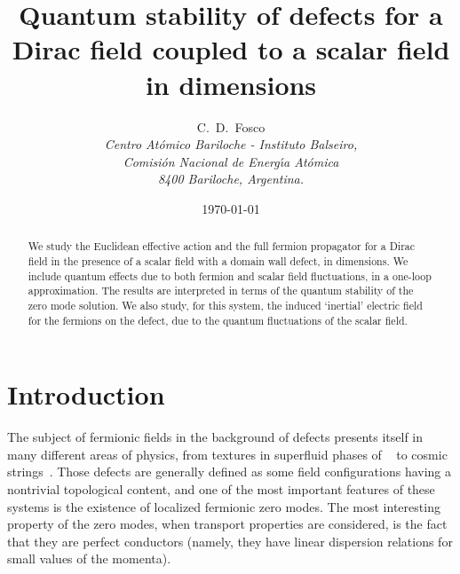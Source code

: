 \documentclass[a4paper,12pt]{article}
\begin{document}
\title{Quantum stability of defects for a Dirac field 
coupled to a scalar field in \coordHE{} dimensions} 
\author{C.~D.~Fosco\coordHE{}
  \\
  {\normalsize\it {}\coordHE{}Centro At{\'o}mico Bariloche - Instituto Balseiro,}\\
  {\normalsize\it Comisi{\'o}n Nacional de Energ{\'\i}a At{\'o}mica}\\
  {\normalsize\it 8400 Bariloche, Argentina.}}  
\date{\today}
\maketitle
\begin{abstract}
\noindent We study the Euclidean effective action and the
full fermion propagator for a Dirac field in the presence of a scalar
field with a domain wall defect, in \coordHE{} dimensions. We include
quantum effects due to both fermion and scalar field fluctuations, 
in a one-loop approximation. The results are interpreted in terms of
the quantum stability of the zero mode solution. We also study, for
this system, the induced `inertial' electric field for the fermions
on the defect, due to the quantum fluctuations of the scalar field.
\end{abstract}
\bigskip
\newpage
\section{Introduction}\label{intro}
The subject of fermionic fields in the background of defects presents
itself in many different areas of physics, from textures in superfluid
phases of \coordHE{}~\cite{he3} to cosmic strings~\cite{cosmic}. Those
defects are generally defined as some field configurations having a
nontrivial topological content, and one of the most important features
of these systems is the existence of localized fermionic zero modes.
The most interesting property of the zero modes, when transport
properties are considered, is the fact that they are perfect
conductors (namely, they have linear dispersion relations for small
values of the momenta).
\end{document}
